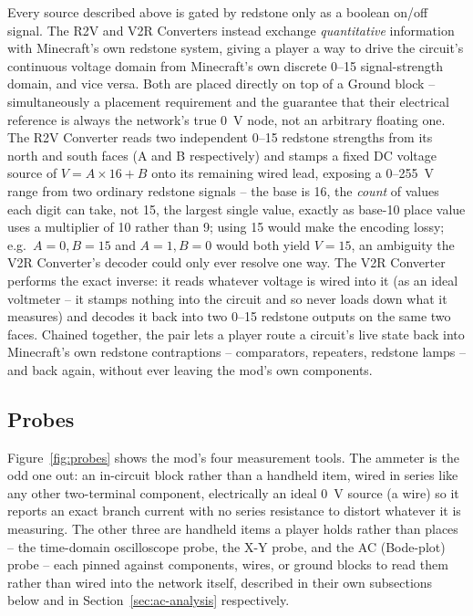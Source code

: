 Every source described above is gated by redstone only as a boolean on/off signal. The R2V and
V2R Converters instead exchange \emph{quantitative} information with Minecraft's own redstone
system, giving a player a way to drive the circuit's continuous voltage domain from
Minecraft's own discrete 0--15 signal-strength domain, and vice versa. Both are placed directly
on top of a Ground block -- simultaneously a placement requirement and the guarantee that their
electrical reference is always the network's true 0~V node, not an arbitrary floating one. The
R2V Converter reads two independent 0--15 redstone strengths from its north and south faces
(A and B respectively) and stamps a fixed DC voltage source of $V = A \times 16 + B$ onto its
remaining wired lead, exposing a 0--255~V range from two ordinary redstone signals -- the base
is 16, the \emph{count} of values each digit can take, not 15, the largest single value, exactly
as base-10 place value uses a multiplier of 10 rather than 9; using 15 would make the encoding
lossy; e.g.\ $A{=}0,B{=}15$ and $A{=}1,B{=}0$ would both yield $V{=}15$, an ambiguity the V2R
Converter's decoder could only ever resolve one way. The V2R Converter performs the exact inverse: it reads
whatever voltage is wired into it (as an ideal voltmeter -- it stamps nothing into the circuit
and so never loads down what it measures) and decodes it back into two 0--15 redstone outputs
on the same two faces. Chained together, the pair lets a player route a circuit's live state
back into Minecraft's own redstone contraptions -- comparators, repeaters, redstone lamps -- and
back again, without ever leaving the mod's own components.

\subsection{Probes}
\label{sec:probes}

Figure~\ref{fig:probes} shows the mod's four measurement tools. The ammeter is the odd one
out: an in-circuit block rather than a handheld item, wired in series like any other
two-terminal component, electrically an ideal 0~V source (a wire) so it reports an exact
branch current with no series resistance to distort whatever it is measuring. The other three
are handheld items a player holds rather than places -- the time-domain oscilloscope probe,
the X-Y probe, and the AC (Bode-plot) probe -- each pinned against components, wires, or
ground blocks to read them rather than wired into the network itself, described in their own
subsections below and in Section~\ref{sec:ac-analysis} respectively.

